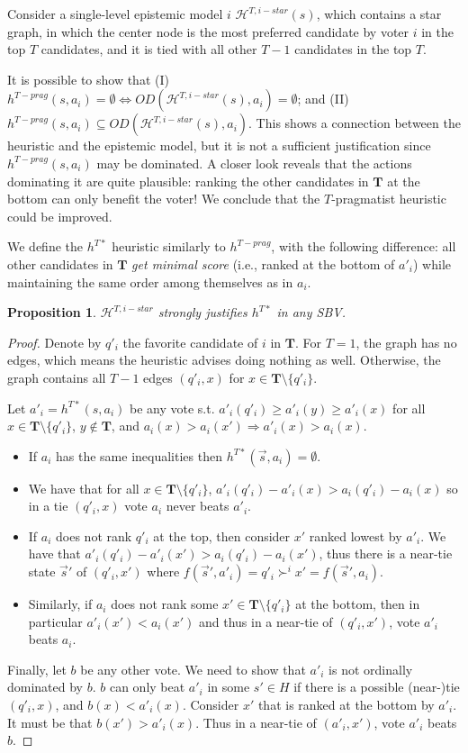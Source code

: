 \documentclass[letterpaper]{article} %
\def\calH{\mathcal{H}}
\newtheorem{proposition}[theorem]{Proposition}
\begin{document}
Consider a single-level epistemic model $i$ $\calH^{T,i-star}(s)$, which contains a star graph, in which the center node is the most preferred candidate by voter $i$ in the top $T$ candidates, and it is tied with all other $T-1$ candidates in the top $T$.

It is possible to show that (I) $h^{T-prag}(s,a_i)=\emptyset \iff OD(\calH^{T,i-star}(s),a_i)=\emptyset$; and (II) $h^{T-prag}(s,a_i) \subseteq OD(\calH^{T,i-star}(s),a_i)$.
This shows a connection between the heuristic and the epistemic model, but it is not a sufficient justification since $h^{T-prag}(s,a_i)$ may be dominated. A closer look reveals that the actions dominating it are quite plausible: ranking the other candidates in $\mathbf  T$ at the bottom can only benefit the voter! We conclude that the $T$-pragmatist heuristic could be improved. 

We define the $h^{T*}$ heuristic similarly to $h^{T-prag}$, with the following difference: all other candidates in $\mathbf  T$ \emph{get minimal score} (i.e., ranked at the bottom of $a'_i$) while maintaining the same order among themselves as in $a_i$.
\begin{proposition}
$\calH^{T,i-star}$ strongly justifies $h^{T*}$ in any SBV.
\end{proposition}
\begin{proof}
Denote by $q'_i$ the favorite candidate of $i$ in $\mathbf  T$. 
For $T=1$, the graph has no edges, which means the heuristic advises doing nothing as well. 
Otherwise, the graph contains all $T-1$ edges $(q'_i,x)$ for $x\in \mathbf  T\setminus \{q'_i\}$.

Let $a'_i=h^{T*}(s,a_i)$ be any vote s.t. $a'_i(q'_i) \geq a'_i(y) \geq a'_i(x)$ for all $x\in \mathbf  T\setminus \{q'_i\}$, $y\notin \mathbf  T$, and $a_i(x)>a_i(x') \Rightarrow a'_i(x)>a_i(x)$.
\begin{itemize}
\item If $a_i$ has the same inequalities then $h^{T*}(\vec s,a_i)=\emptyset$. 
\item We have that for all $x \in \mathbf T\setminus \{q'_i\}$, $a'_i(q'_i)-a'_i(x) > a_i(q'_i)-a_i(x)$ so in a tie $(q'_i,x)$ vote $a_i$ never beats $a'_i$.
\item If $a_i$ does not rank $q'_i$ at the top, then consider $x'$ ranked lowest by $a'_i$. We have that $a'_i(q'_i)-a'_i(x') > a_i(q'_i)-a_i(x')$, thus there is  a near-tie state $\vec s'$ of $(q'_i,x')$ where $f(\vec s',a'_i)=q'_i \succ^i x' = f(\vec s',a_i)$.    
\item Similarly, if $a_i$ does not rank some $x' \in \mathbf T\setminus \{q'_i\}$ at the bottom,  then in particular $a'_i(x') <a_i(x')$ and thus in a near-tie of $(q'_i,x')$, vote $a'_i$ beats $a_i$.
\end{itemize} 
Finally, let $b$ be any other vote. We need to show that $a'_i$ is not ordinally dominated by $b$. $b$ can only beat $a'_i$  in some $s'\in H$ if there is a possible (near-)tie $(q'_i,x)$, and $b(x)<a'_i(x)$. Consider $x'$ that is ranked at the bottom by $a'_i$. It must be that $b(x') > a'_i(x)$. Thus in a near-tie of $(a'_i,x')$, vote $a'_i$ beats $b$.   
\end{proof}
\end{document}
